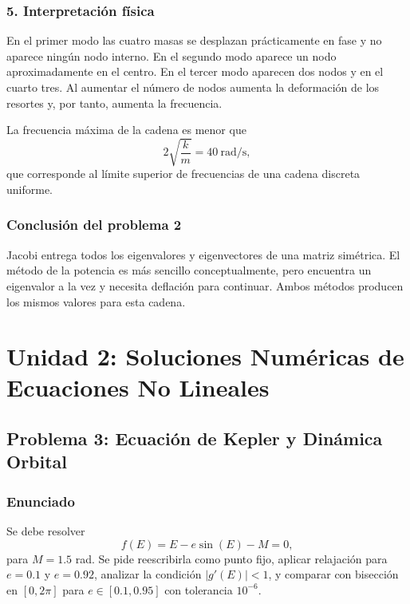 \documentclass[11pt,a4paper]{article}
\begin{document}
\subsubsection*{5. Interpretación física}

En el primer modo las cuatro masas se desplazan prácticamente en fase y no aparece ningún nodo interno. En el segundo modo aparece un nodo aproximadamente en el centro. En el tercer modo aparecen dos nodos y en el cuarto tres. Al aumentar el número de nodos aumenta la deformación de los resortes y, por tanto, aumenta la frecuencia.

La frecuencia máxima de la cadena es menor que
\[
2\sqrt{\frac{k}{m}}=40\ \mathrm{rad/s},
\]
que corresponde al límite superior de frecuencias de una cadena discreta uniforme.

\subsubsection*{Conclusión del problema 2}

Jacobi entrega todos los eigenvalores y eigenvectores de una matriz simétrica. El método de la potencia es más sencillo conceptualmente, pero encuentra un eigenvalor a la vez y necesita deflación para continuar. Ambos métodos producen los mismos valores para esta cadena.

\section{Unidad 2: Soluciones Numéricas de Ecuaciones No Lineales}

\subsection{Problema 3: Ecuación de Kepler y Dinámica Orbital}

\subsubsection*{Enunciado}

Se debe resolver
\begin{equation}
f(E)=E-e\sin(E)-M=0,
\end{equation}
para $M=1.5$ rad. Se pide reescribirla como punto fijo, aplicar relajación para $e=0.1$ y $e=0.92$, analizar la condición $|g'(E)|<1$, y comparar con bisección en $[0,2\pi]$ para $e\in[0.1,0.95]$ con tolerancia $10^{-6}$.
\end{document}
